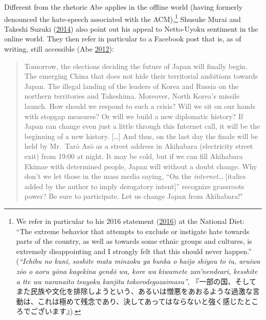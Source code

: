 \documentclass[10pt,british,A4paper,oneside]{memoir}
\begin{document}
Different from the rhetoric Abe applies in the offline world (having
formerly denounced the hate-speech associated with the ACM),\footnote{We
  refer in particular to his 2016 statement
  (\protect\hyperlink{ref-abe_house_2016}{2016}) at the National Diet:
  ``The extreme behavior that attempts to exclude or instigate hate
  towards parts of the country, as well as towards some ethnic groups
  and cultures, is extremely disappointing and I strongly felt that this
  should never happen.'' (\emph{``Ichibu no kuni, soshite mata minzoku ya
  bunka o haijo shiyou to iu, aruiwa zōo o aoru yōna kagekina gendō wa,
  kore wa kiwamete zan'nendeari, kesshite a tte wa naranaito tsuyoku
  kanjita tokorodegozaimasu''},
  『一部の国、そしてまた民族や文化を排除しようという、あるいは憎悪をあおるような過激な言動は、これは極めて残念であり、決してあってはならないと強く感じたところでございます』).}
Shusuke Murai and Takeshi Suzuki
(\protect\hyperlink{ref-hollihan_how_2014}{2014}) also point out his
appeal to Netto-Uyoku sentiment in the online world. They then refer in
particular to a Facebook post that is, as of writing, still accessible
(Abe \protect\hyperlink{ref-abe_1_2012}{2012}):

\begin{quote}
Tomorrow, the elections deciding the future of Japan will finally begin.
The emerging China that does not hide their territorial ambitions
towards Japan. The illegal landing of the leaders of Korea and Russia on
the northern territories and Takeshima. Moreover, North Korea's missile
launch. How should we respond to such a crisis? Will we sit on our hands
with stopgap measures? Or will we build a new diplomatic history? If
Japan can change even just a little through this Internet call, it will
be the beginning of a new history. {[}\ldots{}{]} And thus, on the last
day the finale will be held by Mr.~Tarō Asō as a street address in
Akihabara (electricity street exit) from 19:00 at night. It may be cold,
but if we can fill Akihabara Ekimae with determined people, Japan will
without a doubt change. Why don't we let those in the mass media saying,
``On the \emph{internet}\ldots{} {[}italics added by the author to imply
derogatory intent{]}'' recognize grassroots power? Be sure to
participate. Let us change Japan from Akihabara!"
\end{quote}
\end{document}
